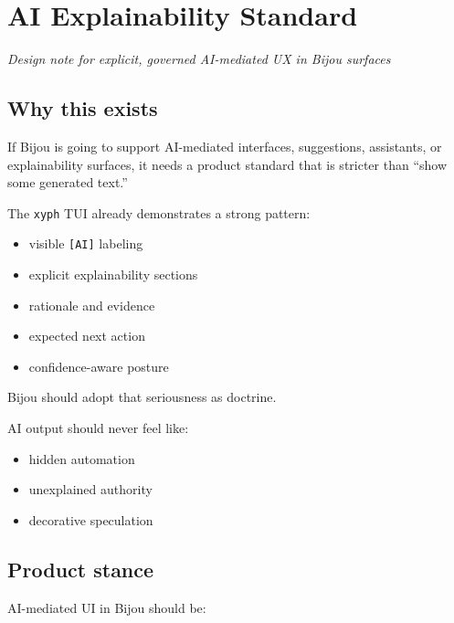 \chapter{AI Explainability Standard}\label{record-033}

\smallskip

\emph{Design note for explicit, governed AI-mediated UX in Bijou surfaces}

\section{Why this exists}\label{record-033-why-this-exists}

If Bijou is going to support AI-mediated interfaces, suggestions, assistants, or explainability surfaces, it needs a product standard that is stricter than ``show some generated text.''

The \texttt{x\allowbreak{}y\allowbreak{}p\allowbreak{}h} TUI already demonstrates a strong pattern:

\begin{itemize}
\tightlist
\item
  visible \texttt{[\allowbreak{}A\allowbreak{}I\allowbreak{}]} labeling
\item
  explicit explainability sections
\item
  rationale and evidence
\item
  expected next action
\item
  confidence-aware posture
\end{itemize}

Bijou should adopt that seriousness as doctrine.

AI output should never feel like:

\begin{itemize}
\tightlist
\item
  hidden automation
\item
  unexplained authority
\item
  decorative speculation
\end{itemize}

\section{Product stance}\label{record-033-product-stance}

AI-mediated UI in Bijou should be:

